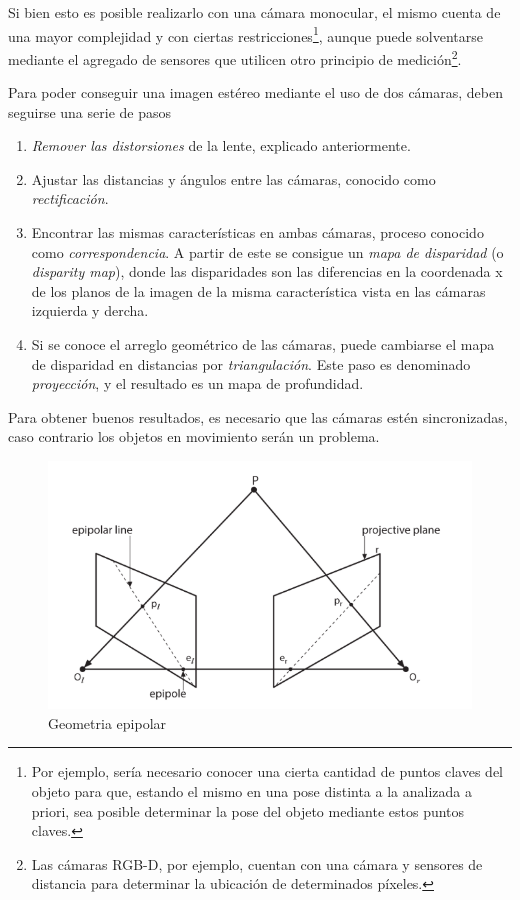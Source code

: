 Si bien esto es posible realizarlo con una cámara monocular, el mismo cuenta de una mayor complejidad y con ciertas restricciones\footnote{Por ejemplo, sería necesario conocer una cierta cantidad de puntos claves del objeto para que, estando el mismo en una pose distinta a la analizada a priori, sea posible determinar la pose del objeto mediante estos puntos claves.}, aunque puede solventarse mediante el agregado de sensores que utilicen otro principio de medición\footnote{Las cámaras RGB-D, por ejemplo, cuentan con una cámara y sensores de distancia para determinar la ubicación de determinados píxeles.}.

Para poder conseguir una imagen estéreo mediante el uso de dos cámaras, deben seguirse una serie de pasos \cite{kaehler2017}
\begin{enumerate}
    \item \textit{Remover las distorsiones} de la lente, explicado anteriormente.
    \item Ajustar las distancias y ángulos entre las cámaras, conocido como \textit{rectificación}.
    \item Encontrar las mismas características en ambas cámaras, proceso conocido como \textit{correspondencia}. A partir de este se consigue un \textit{mapa de disparidad} (o \textit{disparity map}), donde las disparidades son las diferencias en la coordenada x de los planos de la imagen de la misma característica vista en las cámaras izquierda y dercha.
    \item Si se conoce el arreglo geométrico de las cámaras, puede cambiarse el mapa de disparidad en distancias por \textit{triangulación}. Este paso es denominado \textit{proyección}, y el resultado es un mapa de profundidad.
\end{enumerate}

Para obtener buenos resultados, es necesario que las cámaras estén sincronizadas, caso contrario los objetos en movimiento serán un problema.
\begin{figure}
    \centering
    \includegraphics[width=\linewidth]{Img/EpipoleGeometry.png}
    \caption{Geometria epipolar}
    \label{fig:epipolegeometry}
\end{figure}
